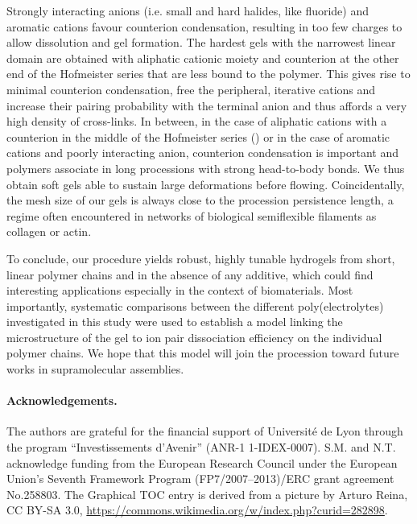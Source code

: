 \documentclass[twoside,twocolumn,9pt]{article}
\begin{document}
Strongly interacting anions (i.e. small and hard halides, like fluoride) and aromatic cations favour counterion condensation, resulting in too few charges to allow dissolution and gel formation. The hardest gels with the narrowest linear domain are obtained with aliphatic cationic moiety and counterion at the other end of the Hofmeister series that are less bound to the polymer. This gives rise to minimal counterion condensation, free the peripheral, iterative cations and increase their pairing probability with the terminal anion and thus affords a very high density of cross-links. In between, in the case of aliphatic cations with a counterion in the middle of the Hofmeister series () or in the case of aromatic cations and poorly interacting anion, counterion condensation is important and polymers associate in long processions with strong head-to-body bonds. We thus obtain soft gels able to sustain large deformations before flowing. Coincidentally, the mesh size of our gels is always close to the procession persistence length, a regime often encountered in networks of biological semiflexible filaments as collagen or actin\cite{Meng2016}.

To conclude, our procedure yields robust, highly tunable hydrogels from short, linear polymer chains and in the absence of any additive, which could find interesting applications especially in the context of biomaterials. Most importantly, systematic comparisons between the different poly(electrolytes) investigated in this study were used to establish a model linking the microstructure of the gel to ion pair dissociation efficiency on the individual polymer chains. We hope that this model will join the procession toward future works in supramolecular assemblies.

\paragraph*{Acknowledgements.}
The authors are grateful for the financial support of Universit\'{e} de Lyon through the program ``Investissements d'Avenir'' (ANR-1 1-IDEX-0007). S.M. and N.T. acknowledge funding from the European Research Council under the European Union's Seventh Framework Program (FP7/2007–2013)/ERC grant agreement No.258803. The Graphical TOC entry is derived from a picture by Arturo Reina, CC BY-SA 3.0, \url{https://commons.wikimedia.org/w/index.php?curid=282898}.


\end{document}
